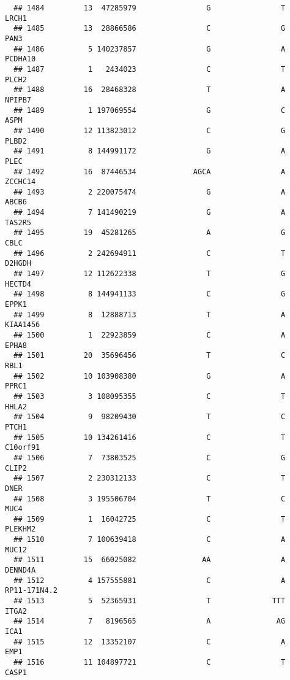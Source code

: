 \documentclass[12pt,twoside]{reedthesis}
\theoremstyle{definition}
\theoremstyle{definition}
\theoremstyle{remark}
\begin{document}
\begin{verbatim}
  ## 1484         13  47285979                G                T          LRCH1
  ## 1485         13  28866586                C                G           PAN3
  ## 1486          5 140237857                G                A        PCDHA10
  ## 1487          1   2434023                C                T          PLCH2
  ## 1488         16  28468328                T                A         NPIPB7
  ## 1489          1 197069554                G                C           ASPM
  ## 1490         12 113823012                C                G          PLBD2
  ## 1491          8 144991172                G                A           PLEC
  ## 1492         16  87446534             AGCA                A        ZCCHC14
  ## 1493          2 220075474                G                A          ABCB6
  ## 1494          7 141490219                G                A         TAS2R5
  ## 1495         19  45281265                A                G           CBLC
  ## 1496          2 242694911                C                T         D2HGDH
  ## 1497         12 112622338                T                G         HECTD4
  ## 1498          8 144941133                C                G          EPPK1
  ## 1499          8  12888713                T                A       KIAA1456
  ## 1500          1  22923859                C                A          EPHA8
  ## 1501         20  35696456                T                C           RBL1
  ## 1502         10 103908380                G                A          PPRC1
  ## 1503          3 108095355                C                T          HHLA2
  ## 1504          9  98209430                T                C          PTCH1
  ## 1505         10 134261416                C                T       C10orf91
  ## 1506          7  73803525                C                G          CLIP2
  ## 1507          2 230312133                C                T           DNER
  ## 1508          3 195506704                T                C           MUC4
  ## 1509          1  16042725                C                T        PLEKHM2
  ## 1510          7 100639418                C                A          MUC12
  ## 1511         15  66025082               AA                A        DENND4A
  ## 1512          4 157555881                C                A   RP11-171N4.2
  ## 1513          5  52365931                T              TTT          ITGA2
  ## 1514          7   8196565                A               AG           ICA1
  ## 1515         12  13352107                C                A           EMP1
  ## 1516         11 104897721                C                T          CASP1

\end{verbatim}
\end{document}
